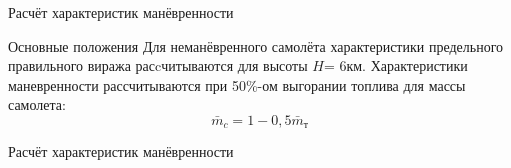 \begin{frame}{Расчёт характеристик манёвренности}
    \begin{block}{Основные положения}
        Для неманёвренного самолёта характеристики предельного правильного виража расcчитываются для высоты $H$= 6км.
        Характеристики маневренности рассчитываются при 50\%-ом выгорании топлива для массы самолета:
        $$\bar{m}_c = 1- 0,5\bar{m}_\text{т}$$
    \end{block}
\end{frame}

\begin{frame}{Расчёт характеристик манёвренности}
    \begin{minipage}[c]{0.45\textwidth}
    \end{minipage}  
    \begin{minipage}[c]{0.45\textwidth}
    \end{minipage}
\end{frame}
